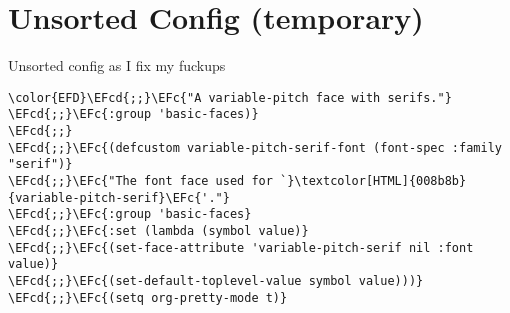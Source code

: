 \documentclass{article}
\newcommand{\EFc}[1]{\textcolor{EFc}{#1}} %
\newcommand{\EFcd}[1]{\textcolor{EFcd}{#1}} %
\begin{document}
\section{Unsorted Config (temporary)}
\label{sec:org8bcaadc}
Unsorted config as I fix my fuckups
\begin{Code}
\begin{Verbatim}
\color{EFD}\EFcd{;;}\EFc{"A variable-pitch face with serifs."}
\EFcd{;;}\EFc{:group 'basic-faces)}
\EFcd{;;}
\EFcd{;;}\EFc{(defcustom variable-pitch-serif-font (font-spec :family "serif")}
\EFcd{;;}\EFc{"The font face used for `}\textcolor[HTML]{008b8b}{variable-pitch-serif}\EFc{'."}
\EFcd{;;}\EFc{:group 'basic-faces}
\EFcd{;;}\EFc{:set (lambda (symbol value)}
\EFcd{;;}\EFc{(set-face-attribute 'variable-pitch-serif nil :font value)}
\EFcd{;;}\EFc{(set-default-toplevel-value symbol value)))}
\EFcd{;;}\EFc{(setq org-pretty-mode t)}









\end{Verbatim}
\end{Code}
\end{document}
